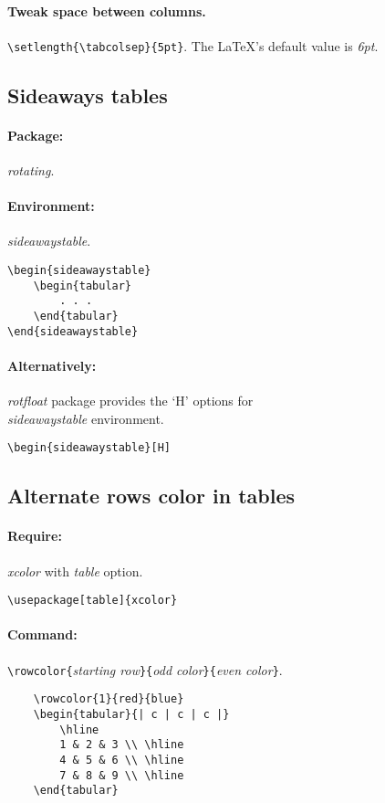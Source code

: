 \documentclass[11pt,a4paper]{article}
\begin{document}
\paragraph{Tweak space between columns.} \verb|\setlength{\tabcolsep}{5pt}|. The \LaTeX{}'s default value is \emph{6pt}.

\subsection{Sideaways tables}
\paragraph{Package:} \emph{rotating}.
\paragraph{Environment:} \emph{sideawaystable}.
\begin{verbatim}
\begin{sideawaystable}
	\begin{tabular}
		. . .
	\end{tabular}
\end{sideawaystable}
\end{verbatim}
\paragraph{Alternatively:} \emph{rotfloat} package provides the `H' options for \\
\emph{sideawaystable} environment.
\begin{verbatim}
\begin{sideawaystable}[H]
\end{verbatim}

\subsection{Alternate rows color in tables}
\paragraph{Require:} \emph{xcolor} with \emph{table} option.
\begin{verbatim}
\usepackage[table]{xcolor}
\end{verbatim}
\paragraph{Command:} \verb|\rowcolor{|\emph{starting row}\verb|}{|\emph{odd color}\verb|}{|\emph{even color}\verb|}|.
\begin{verbatim}
	\rowcolor{1}{red}{blue}
	\begin{tabular}{| c | c | c |}
		\hline
		1 & 2 & 3 \\ \hline
		4 & 5 & 6 \\ \hline
		7 & 8 & 9 \\ \hline
	\end{tabular}
\end{verbatim}
\end{document}
